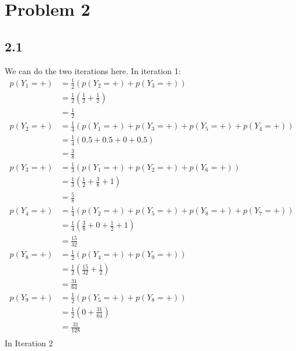 \documentclass{book}
\begin{document}
\newpage 
\section*{Problem 2}
\subsection*{2.1}
We can do the two iterations here. 
In iteration 1: 
    \begin{align*}
        p(Y_1 = +) 
        & = \frac{1}{2}\left( p(Y_2 = +) + p(Y_3 = +) \right)\\
        & = \frac{1}{2}\left( \frac{1}{2} + \frac{1}{2} \right)\\
        & = \frac{1}{2}\\
        p(Y_2 = +) 
        & = \frac{1}{4}\left( p(Y_1 = +) + p(Y_3 = +) + p(Y_5 = +) + p(Y_4 = +) \right)\\
        & = \frac{1}{4}\left( 0.5 + 0.5 + 0 + 0.5 \right)\\
        & = \frac{3}{8} \\
        p(Y_3 = +) 
        & = \frac{1}{3}\left( p(Y_1 = +) + p(Y_2 = +) + p(Y_6 = +)  \right)\\
        & = \frac{1}{3}\left( \frac{1}{2} + \frac{3}{8}  + 1\right)\\
        & = \frac{5}{8} \\
        p(Y_4 = +) 
        & = \frac{1}{4}\left( p(Y_2 = +) + p(Y_5 = +) + p(Y_8 = +) + p(Y_7 = +)  \right)\\
        & = \frac{1}{4}\left( \frac{3}{8} + 0  + \frac{1}{2} + 1 \right)\\
        & = \frac{15}{32} \\
        p(Y_8 = +) 
        & = \frac{1}{2}\left( p(Y_4 = +) + p(Y_9 = +)   \right)\\
        & = \frac{1}{2}\left( \frac{15}{32} + \frac{1}{2} \right)\\
        & = \frac{31}{64} \\
        p(Y_9 = +) 
        & = \frac{1}{2}\left( p(Y_5 = +) + p(Y_8 = +)   \right)\\
        & = \frac{1}{2}\left( 0 + \frac{31}{64} \right)\\
        & = \frac{31}{128} \\
    \end{align*}
In Iteration 2
\end{document}
